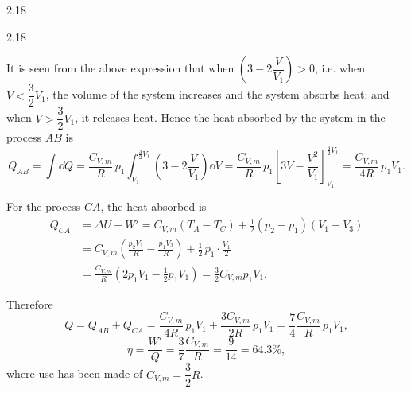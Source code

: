 \begin{solution}{2.18}
\begin{figbox}{2.18}
\end{figbox}

It is seen from the above expression that when $\left(3-2\dfrac{V}{V_1}\right)>0$, i.e. when
$V<\dfrac{3}{2}V_1$, the volume of the system increases and the system absorbs heat; and when
$V>\dfrac{3}{2}V_1$, it releases heat. Hence the heat absorbed by the system in the process $AB$
is
\begin{equation*}
Q_{AB} = \int \dd Q
= \frac{C_{V,m}}{R}\,p_1\int_{V_1}^{\frac{3}{2}V_1}
\left(3-2\frac{V}{V_1}\right)\dd V
= \frac{C_{V,m}}{R}\,p_1\left[3V-\frac{V^2}{V_1}\right]_{V_1}^{\frac{3}{2}V_1}
= \frac{C_{V,m}}{4R}\,p_1V_1 .
\end{equation*}

For the process $CA$, the heat absorbed is
\begin{align*}
Q_{CA} &= \Delta U + W'
= C_{V,m}\left(T_A-T_C\right) + \frac{1}{2}\left(p_2-p_1\right)\left(V_1-V_3\right)\\
&= C_{V,m}\left(\frac{p_2V_1}{R}-\frac{p_1V_3}{R}\right)
+ \frac{1}{2}\,p_1\cdot\frac{V_1}{2}\\
&= \frac{C_{V,m}}{R}\left(2p_1V_1-\frac{1}{2}p_1V_1\right)
= \frac{3}{2}C_{V,m}p_1V_1 .
\end{align*}

Therefore
\begin{equation*}
Q = Q_{AB} + Q_{CA}
= \frac{C_{V,m}}{4R}\,p_1V_1 + \frac{3C_{V,m}}{2R}\,p_1V_1
= \frac{7}{4}\frac{C_{V,m}}{R}\,p_1V_1 ,
\end{equation*}
\begin{equation*}
\eta = \frac{W'}{Q} = \frac{3}{7}\frac{C_{V,m}}{R} = \frac{9}{14} = 64.3\%,
\end{equation*}
where use has been made of $C_{V,m}=\dfrac{3}{2}R$.


\end{solution}
